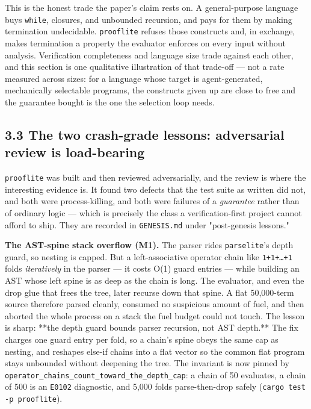 \documentclass[11pt]{article}
\newcommand{\code}[1]{\texttt{#1}}
\begin{document}
This is the honest trade the paper's claim rests on. A general-purpose language
buys \code{while}, closures, and unbounded recursion, and pays for them by making
termination undecidable. \code{prooflite} refuses those constructs and, in exchange,
makes termination a property the evaluator enforces on every input without
analysis. Verification completeness and language size trade against each other,
and this section is one qualitative illustration of that trade-off --- not a rate
measured across sizes: for a language whose target is agent-generated,
mechanically selectable programs, the constructs given up are close to free and
the guarantee bought is the one the selection loop needs.

\subsection*{3.3 The two crash-grade lessons: adversarial review is load-bearing}

\code{prooflite} was built and then reviewed adversarially, and the review is where
the interesting evidence is. It found two defects that the test suite as written
did not, and both were process-killing, and both were failures of a \emph{guarantee}
rather than of ordinary logic --- which is precisely the class a
verification-first project cannot afford to ship. They are recorded in
\code{GENESIS.md} under "post-genesis lessons."

\textbf{The AST-spine stack overflow (M1).} The parser rides \code{parselite}'s depth
guard, so nesting is capped. But a left-associative operator chain like
\code{1+1+\ldots{}+1} folds \emph{iteratively} in the parser --- it costs O(1) guard entries ---
while building an AST whose left spine is as deep as the chain is long. The
evaluator, and even the drop glue that frees the tree, later recurse down that
spine. A flat 50,000-term source therefore parsed cleanly, consumed no
suspicious amount of fuel, and then aborted the whole process on a stack the
fuel budget could not touch. The lesson is sharp: **the depth guard bounds
parser recursion, not AST depth.** The fix charges one guard entry per fold, so
a chain's spine obeys the same cap as nesting, and reshapes else-if chains into
a flat vector so the common flat program stays unbounded without deepening the
tree. The invariant is now pinned by
\code{operator\_chains\_count\_toward\_the\_depth\_cap}: a chain of 50 evaluates, a chain
of 500 is an \code{E0102} diagnostic, and 5,000 folds parse-then-drop safely
(\code{cargo test -p prooflite}).
\end{document}
